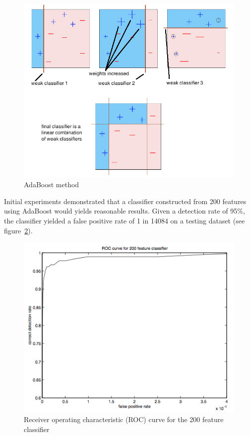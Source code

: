 \begin{figure}[!h]
\begin{center}
\noindent \includegraphics[scale=0.6]{figures/haar_feature_adaboost} 
\newline
\caption{AdaBoost method}
\label{haar_feature_adaboost}
\end{center} 
\end{figure}

\noindent Initial experiments demonstrated that a classifier constructed from 200 features using AdaBoost would yields reasonable results. Given a detection rate of 95\%, the classifier yielded a false positive rate of 1 in 14084 on a testing dataset (see figure~\ref{haar_feature_example_result})\cite{VIO01}.
\newline

\begin{figure}[!h]
\begin{center}
\noindent \includegraphics[scale=0.8]{figures/haar_feature_example_result} 
\newline
\caption{Receiver operating characteristic (ROC) curve for the 200 feature classifier}
\label{haar_feature_example_result}
\end{center} 
\end{figure}

